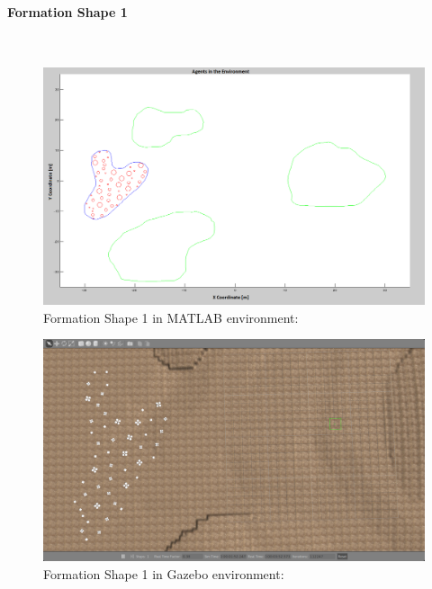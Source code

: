    \paragraph{Formation Shape 1}\hspace{0pt} \\
		
			\begin{figure}[H]
				\caption{Formation Shape 1 in MATLAB environment:}
				\centerline{\includegraphics[scale = 0.40]{Trajectories_Formation_Shape_1_2}}
			\end{figure} 	
			
				\begin{figure}[H]
					\caption{Formation Shape 1 in Gazebo environment:}
					\centerline{\includegraphics[scale = 0.35]{Trajectories_Formation_Shape_1_1}}
				\end{figure} 	
		
